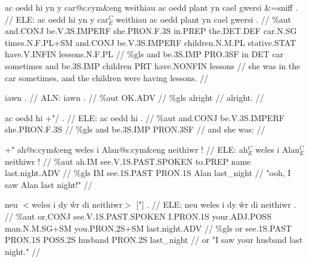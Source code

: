 \documentclass[a4paper,10pt]{article}
\begin{document}
\ex
\begingl[lingstyle=gergl]
\glchat ac oedd hi yn y car@s:cym\&eng weithiau ac oedd plant yn cael gwersi \&=sniff . //
\glsurface ELE:  ac oedd hi yn y car$^{C}_{E}$ weithiau ac oedd plant yn cael gwersi .  //
\glauto \%aut  and{\scriptsize .CONJ} be{\scriptsize .V.3S.IMPERF} she{\scriptsize .PRON.F.3S} in{\scriptsize .PREP} the{\scriptsize .DET.DEF} car{\scriptsize .N.SG} times{\scriptsize .N.F.PL+SM} and{\scriptsize .CONJ} be{\scriptsize .V.3S.IMPERF} children{\scriptsize .N.M.PL} stative{\scriptsize .STAT} have{\scriptsize .V.INFIN} lessons{\scriptsize .N.F.PL}   //
\glmanual \%gls  and be{\scriptsize .3S.IMP} PRO{\scriptsize .3SF} in DET car sometimes and be{\scriptsize .3S.IMP} children PRT have{\scriptsize .NONFIN} lessons   //
\gleng she was in the car sometimes, and the children were having lessons. //
\endgl
\xe

\ex
\begingl[lingstyle=gergl]
\glchat iawn . //
\glsurface ALN:  iawn .  //
\glauto \%aut  OK{\scriptsize .ADV}   //
\glmanual \%gls  alright   //
\gleng alright. //
\endgl
\xe

\ex
\begingl[lingstyle=gergl]
\glchat ac oedd hi +"/ . //
\glsurface ELE:  ac oedd hi .  //
\glauto \%aut  and{\scriptsize .CONJ} be{\scriptsize .V.3S.IMPERF} she{\scriptsize .PRON.F.3S}   //
\glmanual \%gls  and be{\scriptsize .3S.IMP} PRON{\scriptsize .3SF}   //
\gleng and she was: //
\endgl
\xe

\ex
\begingl[lingstyle=gergl]
\glchat +" ah@s:cym\&eng weles i Alan@s:cym\&eng neithiwr ! //
\glsurface ELE:  ah$^{C}_{E}$ weles i Alan$^{C}_{E}$ neithiwr !  //
\glauto \%aut  ah{\scriptsize .IM} see{\scriptsize .V.1S.PAST.SPOKEN} to{\scriptsize .PREP} name last{\scriptsize .night.ADV}   //
\glmanual \%gls  IM see{\scriptsize .1S.PAST} PRON{\scriptsize .1S} Alan last\_night   //
\gleng "ooh, I saw Alan last night!" //
\endgl
\xe

\ex
\begingl[lingstyle=gergl]
\glchat neu $<$weles i dy ŵr di neithiwr$>$ ["] . //
\glsurface ELE:  neu weles i dy ŵr di neithiwr .  //
\glauto \%aut  or{\scriptsize .CONJ} see{\scriptsize .V.1S.PAST.SPOKEN} I{\scriptsize .PRON.1S} your{\scriptsize .ADJ.POSS} man{\scriptsize .N.M.SG+SM} you{\scriptsize .PRON.2S+SM} last{\scriptsize .night.ADV}   //
\glmanual \%gls  or see{\scriptsize .1S.PAST} PRON{\scriptsize .1S} POSS{\scriptsize .2S} husband PRON{\scriptsize .2S} last\_night   //
\gleng or "I saw your husband last night." //
\endgl
\xe
\end{document}
